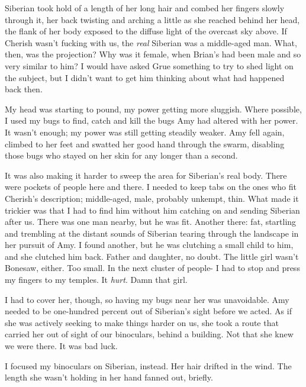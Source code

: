 Siberian took hold of a length of her long hair and combed her fingers slowly through it, her back twisting and arching a little as she reached behind her head, the flank of her body exposed to the diffuse light of the overcast sky above.  If Cherish wasn't fucking with us, the \emph{real} Siberian was a middle-aged man.  What, then, was the projection?  Why was it female, when Brian's had been male and so very similar to him?  I would have asked Grue something to try to shed light on the subject, but I didn't want to get him thinking about what had happened back then.



My head was starting to pound, my power getting more sluggish.  Where possible, I used my bugs to find, catch and kill the bugs Amy had altered with her power.  It wasn't enough; my power was still getting steadily weaker.  Amy fell again, climbed to her feet and swatted her good hand through the swarm, disabling those bugs who stayed on her skin for any longer than a second.



It was also making it harder to sweep the area for Siberian's real body.  There were pockets of people here and there.  I needed to keep tabs on the ones who fit Cherish's description; middle-aged, male, probably unkempt, thin.  What made it trickier was that I had to find him without him catching on and sending Siberian after us.  There was one man nearby, but he was fit.  Another there: fat, startling and trembling at the distant sounds of Siberian tearing through the landscape in her pursuit of Amy.  I found another, but he was clutching a small child to him, and she clutched him back.  Father and daughter, no doubt.  The little girl wasn't Bonesaw, either.  Too small.  In the next cluster of people-  I had to stop and press my fingers to my temples.  It \emph{hurt}.  Damn that girl.



I had to cover her, though, so having my bugs near her was unavoidable.  Amy needed to be one-hundred percent out of Siberian's sight before we acted.  As if she was actively seeking to make things harder on us, she took a route that carried her out of sight of our binoculars, behind a building.  Not that she knew we were there.  It was bad luck.



I focused my binoculars on Siberian, instead.  Her hair drifted in the wind.  The length she wasn't holding in her hand fanned out, briefly.



